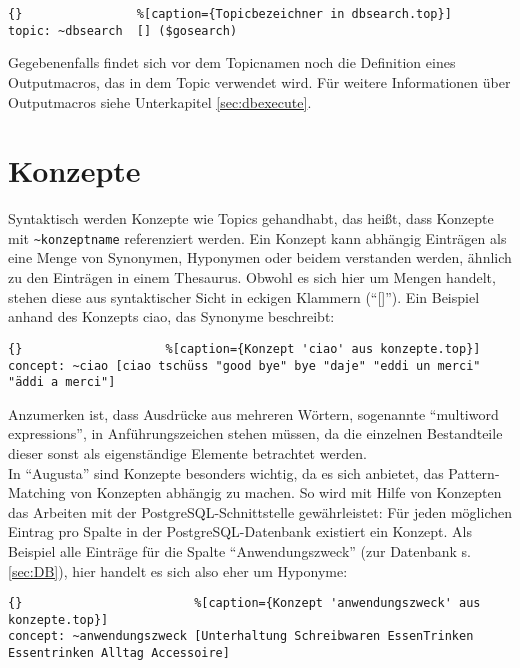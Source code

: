 \begin{lstlisting}{}				%[caption={Topicbezeichner in dbsearch.top}]
topic: ~dbsearch  [] ($gosearch)
\end{lstlisting}

Gegebenenfalls findet sich vor dem Topicnamen noch die Definition eines Outputmacros, das in dem Topic verwendet wird. Für weitere Informationen über Outputmacros siehe Unterkapitel \ref{sec:dbexecute}.\\


\section{Konzepte}
\label{sec:ChatScript: Konzepte}

Syntaktisch werden Konzepte wie Topics gehandhabt, das heißt, dass Konzepte mit \lstinline|~konzeptname| referenziert werden. Ein Konzept kann abhängig Einträgen als eine Menge von Synonymen, Hyponymen oder beidem verstanden werden, ähnlich zu den Einträgen in einem Thesaurus. Obwohl es sich hier um Mengen handelt, stehen diese aus syntaktischer Sicht in eckigen Klammern ("`[]"'). Ein Beispiel anhand des Konzepts \texttildelow ciao, das Synonyme beschreibt:

\begin{lstlisting}{}					%[caption={Konzept 'ciao' aus konzepte.top}]
concept: ~ciao [ciao tschüss "good bye" bye "daje" "eddi un merci" "äddi a merci"]
\end{lstlisting}

Anzumerken ist, dass Ausdrücke aus mehreren Wörtern, sogenannte "`multiword expressions"', in Anführungszeichen stehen müssen, da die einzelnen Bestandteile dieser sonst als eigenständige Elemente betrachtet werden.\\

In "`Augusta"' sind Konzepte besonders wichtig, da es sich anbietet, das Pattern-Matching von Konzepten abhängig zu machen. So wird mit Hilfe von Konzepten das Arbeiten mit der PostgreSQL-Schnittstelle gewährleistet: Für jeden möglichen Eintrag pro Spalte in der PostgreSQL-Datenbank existiert ein Konzept. Als Beispiel alle Einträge für die Spalte "`Anwendungszweck"' (zur Datenbank s. \ref{sec:DB}), hier handelt es sich also eher um Hyponyme:  

\begin{lstlisting}{}						%[caption={Konzept 'anwendungszweck' aus konzepte.top}]
concept: ~anwendungszweck [Unterhaltung Schreibwaren EssenTrinken Essentrinken Alltag Accessoire]
\end{lstlisting}

